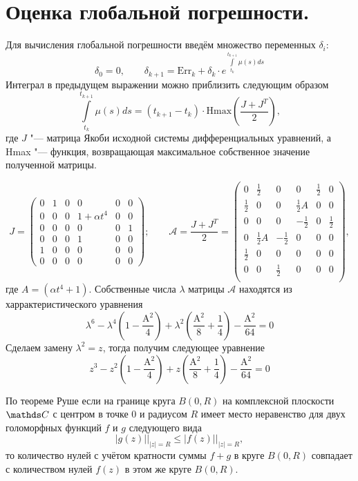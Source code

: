 
\section{Оценка глобальной погрешности.}
Для вычисления глобальной погрешности введём множество переменных $\delta_i:$ 
\[
 \delta_0 = 0, \qquad \delta_{k+1} = \mathrm{Err}_{k} + \delta_{k} \cdot e^{\int\limits_{t_k}^{t_{k+1}} \mu(s) ds} 
\]
Интеграл в предыдущем выражении можно приблизить следующим образом
\[
\int\limits_{t_k}^{t_{k+1}} \mu(s) ds = (t_{k+1} - t_k) \cdot \mathrm{Hmax} \left(\frac{J + J^T}{2} \right),
\]
где $J$ "--- матрица Якоби исходной системы дифференциальных уравнений, а Hmax "--- функция, возвращающая максимальное собственное значение полученной матрицы. 

\[
J = 
\left(
\begin{array}{cccccc}
 0 & 1 & 0 & 0 & 0 & 0 \\
 0 & 0 & 0 & 1 + \alpha t^4 & 0 & 0\\
 0 & 0 & 0 & 0 & 0 & 1 \\
 0 & 0 & 0 & 1 & 0 & 0 \\
 1 & 0 & 0 & 0 & 0 & 0 \\
 0 & 0 & 0 & 0 & 0 & 0 
\end{array}
\right); \qquad
\mathcal{A} = \frac{J + J^T}{2} = 
\left(
\begin{array}{cccccc}
 0 & \frac{1}{2} & 0 & 0 & \frac{1}{2} & 0 \\
 \frac{1}{2} & 0 & 0 & \frac{1}{2} A & 0 & 0 \\
 0 & 0 & 0 & -\frac{1}{2} & 0 & \frac{1}{2} \\
 0 & \frac{1}{2} A & -\frac{1}{2} & 0 & 0 & 0 \\
 \frac{1}{2} & 0 & 0 & 0 & 0 & 0 \\
 0 & 0 & \frac{1}{2} & 0 & 0 & 0 \\
\end{array}
\right),
\]
где $A = \left(\alpha  t^4+1\right)$.
Собственные числа $\lambda$ матрицы $\mathcal{A}$ находятся из харрактеристического уравнения
\begin{equation}
\lambda ^6-\lambda ^4 \left( 1 -\frac{\text{A}^2 }{4}\right)+\lambda ^2 \left(\frac{\text{A}^2 }{8}+\frac{1}{4}\right)-\frac{\text{A}^2}{64} = 0
\end{equation}
Сделаем замену $ \lambda^2 = z$, тогда получим следующее уравнение
\[
z ^3- z ^2 \left( 1 -\frac{\text{A}^2 }{4}\right)+z \left(\frac{\text{A}^2 }{8}+\frac{1}{4}\right)-\frac{\text{A}^2}{64} = 0
\]

По теореме Руше если на границе круга $B(0,R)$ на комплексной плоскости $\C$ с центром в точке $0$ и радиусом $R$ имеет место неравенство для двух голоморфных функций $f$ и $g$ следующего вида
\[
  |g(z)|\big|_{|z| = R}\le |f(z)|\big|_{|z|=R},
\]
то количество нулей с учётом кратности суммы $f+g$ в круге $B(0,R)$ совпадает с количеством нулей $f(z)$ в этом же круге $B(0,R)$.

